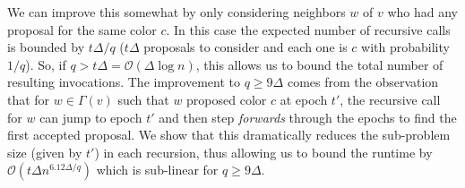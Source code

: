 We can improve this somewhat by only considering neighbors $w$ of $v$ who had any proposal for the same color $c$.
In this case the expected number of recursive calls is bounded by $t\Delta/q$
($t\Delta$ proposals to consider and each one is $c$ with probability $1/q$).
So, if $q > t\Delta = \mathcal O(\Delta\log n)$, this allows us to bound the total number of resulting invocations.
The improvement to $q\ge 9\Delta$ comes from the observation that for $w\in\Gamma(v)$ such that $w$ proposed color $c$ at epoch $t'$,
the recursive call for $w$ can jump to epoch $t'$ and then step \emph{forwards} through the epochs to find the first accepted proposal.
We show that this dramatically reduces the sub-problem size (given by $t'$) in each recursion,
thus allowing us to bound the runtime by $\mathcal O\left(t\Delta n^{6.12\Delta/q}\right)$ which is sub-linear for $q \ge 9\Delta$.
